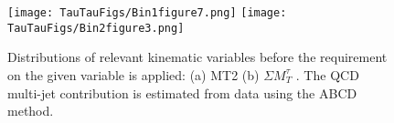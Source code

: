\begin{figure}[htbp]
\centering
\texttt{[image: TauTauFigs/Bin1figure7.png]}
\texttt{[image: TauTauFigs/Bin2figure3.png]} \\
\caption{Distributions of relevant kinematic variables before the requirement on the given variable
is applied: (a) MT2  (b) $\Sigma M_{T}^{\tau}$ . The QCD multi-jet contribution is estimated from data using the ABCD method.}
\label{fig:5QCDbg}
\end{figure}















